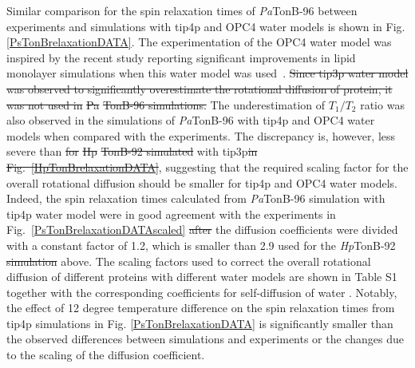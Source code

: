 \documentclass[journal=jpcbfk,manuscript=article]{achemso}
\providecommand{\DIFadd}[1]{{\protect\color{blue}\uwave{#1}}} %
\providecommand{\DIFdel}[1]{{\protect\color{red}\sout{#1}}}                      %
\providecommand{\DIFaddbegin}{} %
\providecommand{\DIFaddend}{} %
\providecommand{\DIFdelbegin}{} %
\providecommand{\DIFdelend}{} %
\begin{document}
Similar comparison for the spin relaxation times of {\it Pa}TonB-96 
between experiments and simulations with \DIFaddbegin \DIFadd{tip3p, }\DIFaddend tip4p and OPC4 water models
is shown in Fig. \ref{PsTonBrelaxationDATA}.
The experimentation of the OPC4 water model was inspired by the
recent study reporting significant improvements in lipid monolayer
simulations when this water model was used~\cite{javanainen18}. 
\DIFdelbegin \DIFdel{Since tip3p water model was observed to significantly overestimate the
rotational diffusion of protein, it was not used in }%
\DIFdel{Pa}%
\DIFdel{TonB-96
simulations. }\DIFdelend The underestimation of $T_1/T_2$ ratio was 
also observed in the simulations of {\it Pa}TonB-96 with
tip4p and OPC4 water models when compared with the experiments.
The discrepancy is, however, less severe than \DIFdelbegin \DIFdel{for }%
\DIFdel{Hp}%
\DIFdel{TonB-92 simulated
}\DIFdelend with tip3p\DIFdelbegin \DIFdel{in Fig.~\ref{HpTonBrelaxationDATA}}\DIFdelend , suggesting that 
the required scaling factor for the overall rotational diffusion should
be smaller for tip4p and OPC4 water models.
Indeed, the spin relaxation times calculated
from {\it Pa}TonB-96 simulation with tip4p water model
were \DIFaddbegin \DIFadd{found to be }\DIFaddend in good agreement with the experiments in Fig.~\ref{PsTonBrelaxationDATAscaled}
\DIFdelbegin \DIFdel{after }\DIFdelend \DIFaddbegin \DIFadd{when }\DIFaddend the diffusion coefficients were divided with a constant factor of 1.2,
which is smaller than 2.9 used for the \DIFaddbegin \DIFadd{tip3p simulation of }\DIFaddend {\it Hp}TonB-92 \DIFdelbegin \DIFdel{simulation }\DIFdelend above.
The scaling factors used to correct the overall rotational diffusion
of different proteins with different water models are shown in Table S1
together with the corresponding coefficients for self-diffusion of water \cite{wong08,izadi14}.
Notably, the effect of 12 degree temperature difference
on the spin relaxation times from tip4p simulations in Fig. \ref{PsTonBrelaxationDATA}
is significantly smaller than the observed differences between simulations and experiments or
the changes due to the scaling of the diffusion coefficient.
\end{document}
